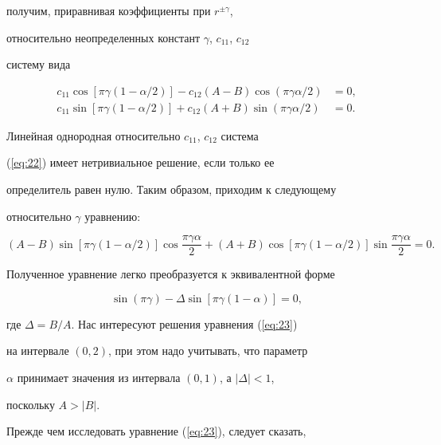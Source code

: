 получим, приравнивая коэффициенты при $r^{\pm\gamma}$,


относительно неопределенных констант $\gamma$, $c_{11}$, $c_{12}$


систему вида


\begin{equation}


\begin{split}


c_{11}\cos[\pi\gamma(1-\alpha/2)]-c_{12}(A-B)\cos(\pi\gamma\alpha/2)&=0,\\


c_{11}\sin[\pi\gamma(1-\alpha/2)]+c_{12}(A+B)\sin(\pi\gamma\alpha/2)&=0.


\end{split}


\label{eq:22}


\end{equation}


Линейная однородная относительно $c_{11}$, $c_{12}$ система


(\ref{eq:22}) имеет нетривиальное решение, если только ее


определитель равен нулю. Таким образом, приходим к следующему


относительно $\gamma$ уравнению:


$$


(A-B)\sin[\pi\gamma(1-\alpha/2)]\cos\frac{\pi\gamma\alpha}{2}+


(A+B)\cos[\pi\gamma(1-\alpha/2)]\sin\frac{\pi\gamma\alpha}{2}=0.


$$


Полученное уравнение легко преобразуется к эквивалентной форме


\begin{equation} 


\sin(\pi\gamma)-\Delta\sin [\pi\gamma(1-\alpha)]=0,


\label{eq:23}


\end{equation}


где $\Delta=B/A$. Нас интересуют решения уравнения (\ref{eq:23})


на интервале $(0,2)$, при этом надо учитывать, что параметр


$\alpha$ принимает значения из интервала $(0,1)$, а $|\Delta|<1$,


поскольку $A>|B|$.





Прежде чем исследовать уравнение (\ref{eq:23}), следует сказать,


